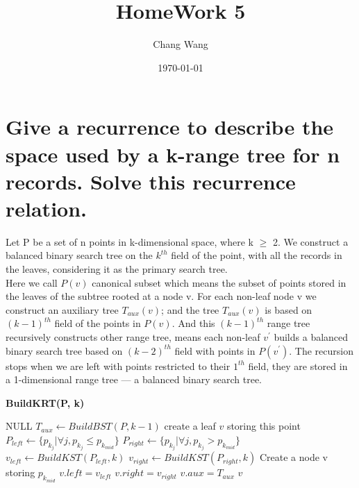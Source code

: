 \documentclass[12pt,a4paper]{report}
\begin{document}
\title{HomeWork 5}
\author{Chang Wang}
\date{\today}
\maketitle
\section{Give a recurrence to describe the space used by a k-range tree for n records. Solve this recurrence relation.}

Let P be a set of n points in k-dimensional space, where k $\ge$ 2. We construct a balanced binary search tree on the $k^{th}$ field of the point, with all the records in the leaves, considering it as the primary search tree. \\[0.2cm]
Here we call $P(v)$ canonical subset which means the subset of points stored in the leaves of the subtree rooted at a node v. For each non-leaf node v we construct an auxiliary tree $T_{aux}(v)$; and the tree $T_{aux}(v)$ is based on $(k-1)^{th}$ field of the points in $P(v)$. And this $(k-1)^{th}$ range tree recursively constructs other range tree, means each non-leaf $v^{'}$ builds a balanced binary search tree based on $(k-2)^{th}$ field with points in $P(v^{'})$. The recursion stops when we are left with points restricted to their $1^{th}$ field, they are stored in a 1-dimensional range tree --- a balanced binary search tree. \\
\begin{algorithm}
\caption{\bf BuildKRT(P, k)}
\begin{algorithmic}[1]

   \RETURN NULL
   \ENDIF
   \STATE $T_{aux} \leftarrow BuildBST(P, k-1)$
   \STATE create a leaf $v$ storing this point
   \ELSE
   \STATE $P_{left} \leftarrow \{ p_{k_{j}} | \forall j , p_{k_{j}} \leq p_{k_{mid}} \}$
   \STATE $P_{right} \leftarrow \{ p_{k_{j}} | \forall j , p_{k_{j}} > p_{k_{mid}} \}$
   \STATE $v_{left} \leftarrow BuildKST(P_{left}, k)$
   \STATE $v_{right} \leftarrow BuildKST(P_{right}, k)$
   \STATE Create a node v storing $p_{k_{mid}}$
   \STATE $v.left = v_{left}$
   \STATE $v.right = v_{right}$
   \STATE $v.aux = T_{aux}$
   \ENDIF
   \RETURN $v$
\end{algorithmic}
\end{algorithm}
\end{document}
